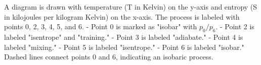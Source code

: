 A diagram is drawn with temperature (T in Kelvin) on the y-axis and entropy (S in kilojoules per kilogram Kelvin) on the x-axis. The process is labeled with points 0, 2, 3, 4, 5, and 6.  
- Point 0 is marked as "isobar" with \( p_0/p_6 \).  
- Point 2 is labeled "isentrope" and "training."  
- Point 3 is labeled "adiabate."  
- Point 4 is labeled "mixing."  
- Point 5 is labeled "isentrope."  
- Point 6 is labeled "isobar."  
Dashed lines connect points 0 and 6, indicating an isobaric process.